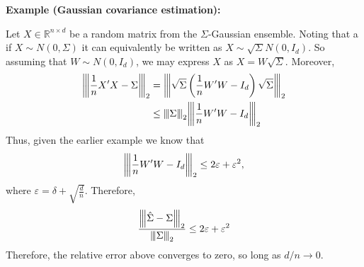 \documentclass[10pt,handout,english]{beamer}
\newcommand{\R}{\mathbb{R}}
\newcommand{\vertiii}[1]{{\left\vert\kern-0.25ex\left\vert\kern-0.25ex\left\vert #1 
    \right\vert\kern-0.25ex\right\vert\kern-0.25ex\right\vert}}
\begin{document}
\begin{frame}[allowframebreaks]
\textbf{Example (Gaussian covariance estimation):} 

Let $X\in\R^{n\times d}$ be a random matrix from the $\Sigma$-Gaussian ensemble. Noting that a if $X\sim N(0,\Sigma)$ it can equivalently be written as $X\sim\sqrt{\Sigma} N(0,I_d)$. So assuming that $W\sim N(0,I_d)$, we may express $X$ as $X=W\sqrt{\Sigma}$. Moreover, 
\begin{align*}
\vertiii{\frac{1}{n}X'X-\Sigma}_2&=\vertiii{\sqrt{\Sigma}\left(\frac{1}{n}W'W-I_d\right)\sqrt{\Sigma}}_2\\
&\leq\vertiii{\Sigma}_2\vertiii{\frac{1}{n}W'W-I_d}_2
\end{align*}
Thus, given the earlier example we know that
\[
\vertiii{\frac{1}{n}W'W-I_d}_2\leq2\varepsilon+\varepsilon^2,
\]
where $\varepsilon=\delta+\sqrt{\frac{d}{n}}$. Therefore, 
\[
\frac{\vertiii{\hat{\Sigma}-\Sigma}_2}{\vertiii{\Sigma}_2}\leq 2\varepsilon+\varepsilon^2
\]
Therefore, the relative error above converges to zero, so long as $d/n\to 0$.
\end{frame}
\end{document}
